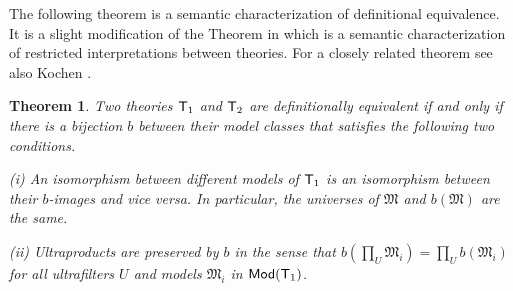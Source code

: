 \documentclass[12pt,leqno]{article}
\newcommand{\Mm}{\mbox{$\mathfrak M$}}
\newcommand{\T}{\mbox{\sf T}}
\newcommand{\Mod}{\mbox{\sf Mod}}
\newtheorem{thm}{Theorem}
\begin{document}
The following theorem is a semantic characterization of definitional
equivalence. It is a slight modification of the Theorem in
\cite{vBP} which is a semantic characterization of restricted
interpretations between theories. For a closely related theorem see also Kochen \cite[Theorem 12.1]{Kochen}.

\begin{thm}\label{main-thm} Two theories $\T_1$ and $\T_2$ are definitionally
equivalent if and only if there is a bijection $b$ between their
model classes that satisfies the following two conditions.
\begin{description}
\item{(i)} An isomorphism between different models of $\T_1$ is
an isomorphism between their $b$-images and vice versa. In
particular, the universes of $\Mm$ and $b(\Mm)$ are the same.
\item{(ii)} Ultraproducts are preserved by $b$ in the sense that
$b(\prod_{U} \Mm_i) = \prod_{U} b(\Mm_i)$ for all ultrafilters $U$
and models $\Mm_i$ in $\Mod(\T_1)$.
\end{description}
\end{thm}
\end{document}
